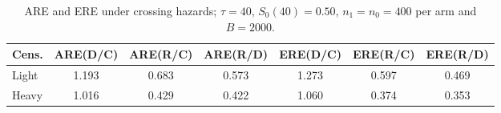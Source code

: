 \begin{table}[ht]
\centering
\caption{ARE and ERE under crossing hazards; $\tau=40$, $S_0(40)=0.50$, $n_1=n_0=400$ per arm and $B=2000$.}
\label{tab:sim-crossing}
\begin{tabular}{lcccccc}
\toprule
Cens. & ARE(D/C) & ARE(R/C) & ARE(R/D) & ERE(D/C) & ERE(R/C) & ERE(R/D)
\\
\midrule
Light & 1.193 & 0.683 & 0.573 & 1.273 & 0.597 & 0.469 \\
\midrule
Heavy & 1.016 & 0.429 & 0.422 & 1.060 & 0.374 & 0.353 \\
\bottomrule
\end{tabular}
\end{table}
